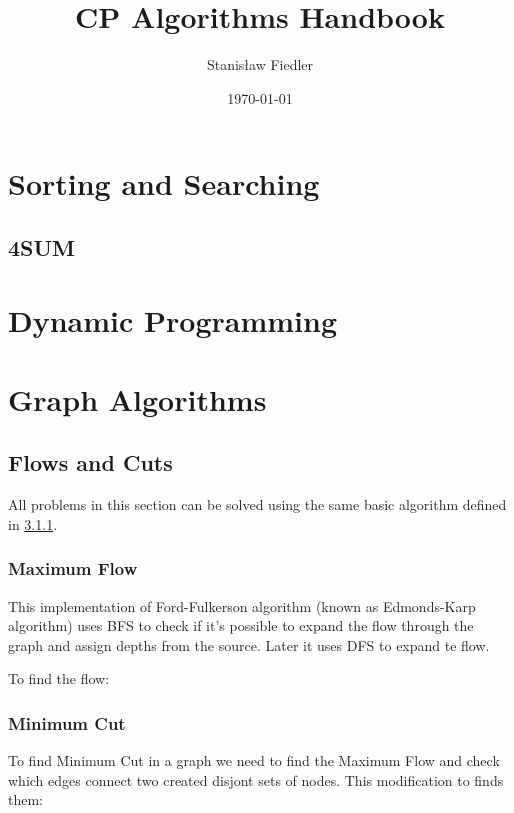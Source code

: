 \documentclass[13pt]{article}
\title{CP Algorithms Handbook}
\author{Stanisław Fiedler}
\date{\today}
\begin{document}
\maketitle
\pagebreak

\tableofcontents
\pagebreak

\section{Sorting and Searching}

\subsection{4SUM}

\section{Dynamic Programming}

\section{Graph Algorithms}

\subsection{Flows and Cuts}
All problems in this section can be solved using the same basic algorithm defined in \ref{sec:MAXFLOW}.

\subsubsection{Maximum Flow}
\label{sec:MAXFLOW}
This implementation of Ford-Fulkerson algorithm (known as Edmonds-Karp algorithm) uses BFS to check if it's possible to expand the flow through the graph and assign depths from the source. Later it uses DFS to expand te flow.


To find the flow:


\subsubsection{Minimum Cut}
To find Minimum Cut in a graph we need to find the Maximum Flow and check which edges connect two created disjont sets of nodes. This modification to finds them:

\end{document}
